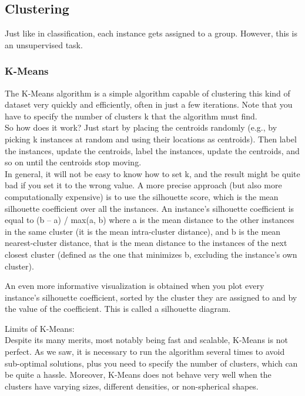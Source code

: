 \documentclass[french]{article}
\begin{document}
\subsection{Clustering}

Just like in classification, each instance gets assigned to a group. However, this is an unsupervised task.

\subsubsection{K-Means}

The K-Means algorithm is a simple algorithm capable of clustering this kind of dataset very quickly and efficiently, often in just a few iterations.  Note that you have to specify the number of clusters k that the algorithm must find.\\

So how does it work? Just start by placing the centroids randomly (e.g., by picking k instances at random and using their locations as centroids). Then label the instances, update the centroids, label the instances, update the centroids, and so on until the centroids stop moving.\\

In general, it will not be easy to know how to set k, and the result might be quite bad if you set it to the wrong value. A more precise approach (but also more computationally expensive) is to use the silhouette score, which is the mean silhouette coefficient over all the instances. An instance’s silhouette coefficient is equal to (b – a) / max(a, b) where a is the mean distance to the other instances in the same cluster (it is the mean intra-cluster distance), and b is the mean nearest-cluster distance, that is the mean distance to the instances of the next closest cluster (defined as the one that minimizes b, excluding the instance’s own
cluster).

An even more informative visualization is obtained when you plot every instance’s silhouette coefficient, sorted by the cluster they are assigned to and by the value of the coefficient. This is called a silhouette diagram.

Limits of K-Means:\\
Despite its many merits, most notably being fast and scalable, K-Means is not perfect.  As we saw, it is necessary to run the algorithm several times to avoid sub-optimal solutions, plus you need to specify the number of clusters, which can be quite a hassle.  Moreover, K-Means does not behave very well when the clusters have varying sizes, different densities, or non-spherical shapes.
\end{document}
